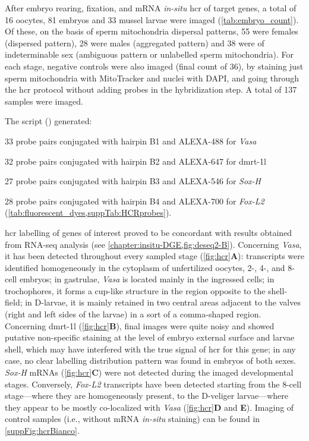 After embryo rearing, fixation, and mRNA \textit{in-situ} \gls{hcr} of target genes, a total of 16 oocytes, 81 embryos and 33 mussel larvae were imaged (\cref{tab:embryo_count}). Of these, on the basis of sperm mitochondria dispersal patterns, 55 were females (dispersed pattern), 28 were males (aggregated pattern) and 38 were of indeterminable sex (ambiguous pattern or unlabelled sperm mitochondria). For each stage, negative controls were also imaged (final count of 36), by staining just sperm mitochondria with MitoTracker and nuclei with DAPI, and going through the \gls{hcr} protocol without adding probes in the hybridization step. A total of 137 samples were imaged.

The  script () generated:
\begin{inlinelist}[itemjoin={{; }}, itemjoin*={{; and }}]
    \item 33 probe pairs conjugated with hairpin B1 and ALEXA-488 for \textit{Vasa}
    \item 32 probe pairs conjugated with hairpin B2 and ALEXA-647 for \gls{dmrt-1l}
    \item 27 probe pairs conjugated with hairpin B3 and ALEXA-546 for \textit{Sox-H}
    \item 28 probe pairs conjugated with hairpin B4 and ALEXA-700 for \textit{Fox-L2} (\cref{tab:fluorescent_dyes,suppTab:HCRprobes}).
\end{inlinelist}
\gls{hcr} labelling of genes of interest proved to be concordant with results obtained from RNA-seq analysis (see \cref{chapter:insitu-DGE,fig:deseq2-B}). Concerning \textit{Vasa}, it has been detected throughout every sampled stage (\cref{fig:hcr}\textbf{A}): transcripts were identified homogeneously in the cytoplasm of unfertilized oocytes, 2-, 4-, and 8-cell embryos; in gastrulae, \textit{Vasa} is located mainly in the ingressed cells; in trochophores, it forms a cup-like structure in the region opposite to the shell-field; in D-larvae, it is mainly retained in two central areas adjacent to the valves (right and left sides of the larvae) in a sort of a comma-shaped region. Concerning \gls{dmrt-1l} (\cref{fig:hcr}\textbf{B}), final images were quite noisy and showed putative non-specific staining at the level of embryo external surface and larvae shell, which may have interfered with the true signal of \gls{hcr} for this gene; in any case, no clear labelling distribution pattern was found in embryos of both sexes. \textit{Sox-H} mRNAs (\cref{fig:hcr}\textbf{C}) were not detected during the imaged developmental stages. Conversely, \textit{Fox-L2} transcripts have been detected starting from the 8-cell stage—where they are homogeneously present, to the D-veliger larvae—where they appear to be mostly co-localized with \textit{Vasa} (\cref{fig:hcr}\textbf{D} and \textbf{E}). Imaging of control samples (i.e., without mRNA \textit{in-situ} staining) can be found in \cref{suppFig:hcrBianco}.

